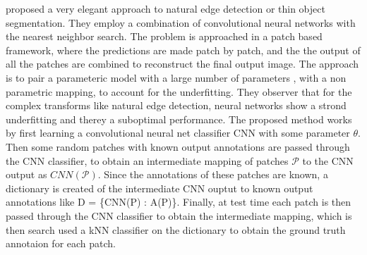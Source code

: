 \citet{ganin2014n} proposed a very elegant approach to natural edge detection or thin object segmentation. They employ a combination of convolutional neural networks with the nearest neighbor search. The problem is approached in a patch based framework, where the predictions are made patch by patch, and the the output of all the patches are combined to reconstruct the final output image. The approach is to pair a parameteric model with a large number of parameters , with a non parametric mapping, to account for the underfitting. They observer that for the complex transforms like natural edge detection, neural networks show a strond underfitting and therey a suboptimal performance. The proposed method works by first learning a convolutional neural net classifier CNN with some parameter $\theta$. Then some random patches with known output annotations are passed through the CNN classifier, to obtain an intermediate mapping of patches $\mathcal{P}$ to the CNN output as $CNN(\mathcal{P})$. Since the annotations of these patches are known, a dictionary is created of the intermediate CNN ouptut to known output annotations like D = \{CNN(P) : A(P)\}. 
Finally, at test time each patch is then passed through the CNN classifier to obtain the intermediate mapping, which is then search used a kNN classifier on the dictionary to obtain the ground truth annotaion for each patch.